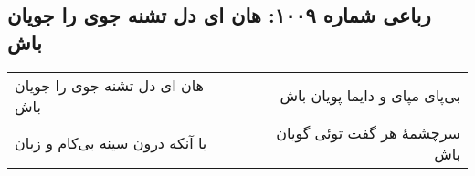 \begin{center}
\section*{رباعی شماره ۱۰۰۹: هان ای دل تشنه جوی را جویان باش}
\label{sec:1009}
\begin{longtable}{l p{0.5cm} r}
هان ای دل تشنه جوی را جویان باش
&&
بی‌پای مپای و دایما پویان باش
\\
با آنکه درون سینه بی‌کام و زبان
&&
سرچشمهٔ هر گفت توئی گویان باش
\\
\end{longtable}
\end{center}

